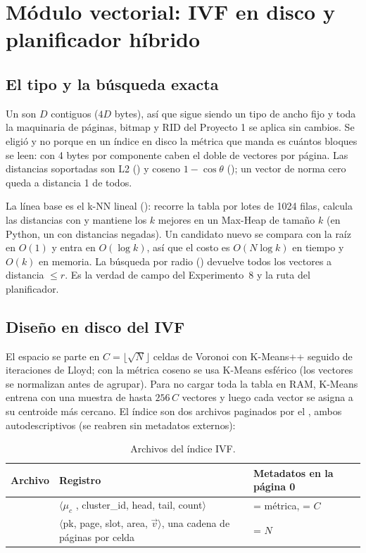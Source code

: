 \section{Módulo vectorial: IVF en disco y planificador híbrido}
\label{sec:vectorial}

\subsection{El tipo  y la búsqueda exacta}

Un  son $D$  contiguos ($4D$ bytes), así que sigue siendo
un tipo de ancho fijo y toda la maquinaria de páginas, bitmap y RID del Proyecto 1 se
aplica sin cambios. Se eligió  y no  porque en un índice en
disco la métrica que manda es cuántos bloques se leen: con 4 bytes por componente caben
el doble de vectores por página. Las distancias soportadas son L2 (\code{<->}) y coseno
$1-\cos\theta$ (\code{<=>}); un vector de norma cero queda a distancia 1 de todos.

La línea base es el k-NN lineal (): recorre la tabla por
lotes de 1024 filas, calcula las distancias con  y mantiene los $k$ mejores
en un Max-Heap de tamaño $k$ (en Python, un  con distancias negadas). Un
candidato nuevo se compara con la raíz en $O(1)$ y entra en $O(\log k)$, así que el
costo es $O(N\log k)$ en tiempo y $O(k)$ en memoria. La búsqueda por radio
() devuelve todos los vectores a distancia $\le r$. Es la verdad de
campo del Experimento~8 y la ruta  del planificador.

\subsection{Diseño en disco del IVF}

El espacio se parte en $C=\lfloor\sqrt{N}\rfloor$ celdas de Voronoi con K-Means++ seguido
de iteraciones de Lloyd; con la métrica coseno se usa K-Means esférico (los vectores se
normalizan antes de agrupar). Para no cargar toda la tabla en RAM, K-Means entrena con
una muestra de hasta $256\,C$ vectores y luego cada vector se asigna a su centroide más
cercano. El índice son dos archivos paginados por el , ambos
autodescriptivos (se reabren sin metadatos externos):

\begin{table}[H]
\centering\small
\begin{tabularx}{\textwidth}{llY}
\toprule
Archivo & Registro & Metadatos en la página 0 \\
\midrule
{} & $\langle\mu_c$ , cluster\_id, head, tail, count$\rangle$ &  = métrica,  = $C$ \\
 & $\langle$pk, page, slot, area, $\vec v\rangle$, una cadena de páginas por celda &  = $N$ \\
\bottomrule
\end{tabularx}
\caption{Archivos del índice IVF.}
\end{table}

